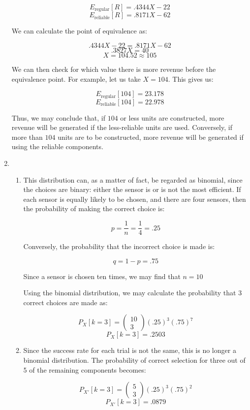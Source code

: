 \begin{enumerate}
    $$E_{\text{regular}}[R]=.4344X-22$$
    $$E_{\text{reliable}}[R]=.8171X-62$$


    We can calculate the point of equivalence as:

    $$.4344X-22=.8171X-62$$
    $$.3827X=40$$
    $$\boxed{X=104.52\approx 105}$$

    We can then check for which value there is more revenue before the equivalence point. For example, let us take $X=104$. This gives us:

    $$E_{\text{regular}}[104]=23.178$$
    $$E_{\text{reliable}}[104]=22.978$$

    Thus, we may conclude that, if $104$ or less units are constructed, more revenue will be generated if the less-reliable units are used. Conversely, if more than $104$ units are to be constructed, more revenue will be generated if using the reliable components.

    \setcounter{enumi}{9}

  \item 

    \begin{enumerate}

      \item This distribution can, as a matter of fact, be regarded as binomial, since the choices are binary: either the sensor is or is not the most efficient. If each sensor is equally likely to be chosen, and there are four sensors, then the probability of making the correct choice is:

        $$\boxed{p=\frac{1}{n}=\frac{1}{4}=.25}$$
        
        Conversely, the probability that the incorrect choice is made is:

        $$q=1-p=.75$$

        Since a sensor is chosen ten times, we may find that $\boxed{n=10}$

        Using the binomial distribution, we may calculate the probability that $3$ correct choices are made as:

        $$P_X[k=3]=\left( \begin{matrix}10\\3\end{matrix} \right)(.25)^3(.75)^7$$
        $$\boxed{P_X[k=3]=.2503}$$

      \item Since the success rate for each trial is not the same, this is no longer a binomial distribution. The probability of correct selection for three out of 5 of the remaining components becomes:

        $$P_{X'}[k=3]=\left( \begin{matrix}5\\3\end{matrix} \right)(.25)^3(.75)^2$$
        $$\boxed{P_{X'}[k=3]=.0879}$$

    \end{enumerate}

\end{enumerate}



